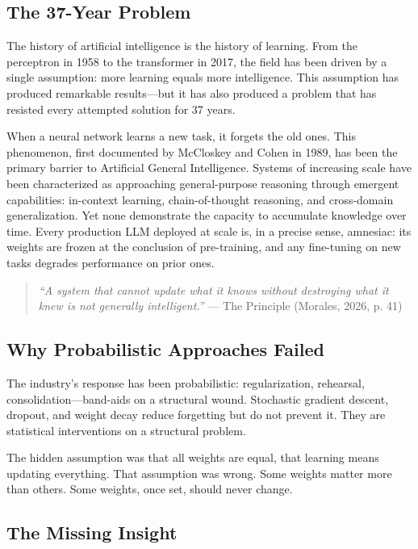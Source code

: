 \documentclass{article}
\begin{document}
\subsection{The 37-Year Problem}

The history of artificial intelligence is the history of learning. From the perceptron in 1958 to the transformer in 2017, the field has been driven by a single assumption: more learning equals more intelligence. This assumption has produced remarkable results---but it has also produced a problem that has resisted every attempted solution for 37 years.

When a neural network learns a new task, it forgets the old ones. This phenomenon, first documented by McCloskey and Cohen in 1989, has been the primary barrier to Artificial General Intelligence. Systems of increasing scale have been characterized as approaching general-purpose reasoning through emergent capabilities: in-context learning, chain-of-thought reasoning, and cross-domain generalization. Yet none demonstrate the capacity to accumulate knowledge over time. Every production LLM deployed at scale is, in a precise sense, amnesiac: its weights are frozen at the conclusion of pre-training, and any fine-tuning on new tasks degrades performance on prior ones.

\begin{quote}
\textit{``A system that cannot update what it knows without destroying what it knew is not generally intelligent.''} --- The Principle (Morales, 2026, p. 41)
\end{quote}

\subsection{Why Probabilistic Approaches Failed}

The industry's response has been probabilistic: regularization, rehearsal, consolidation---band-aids on a structural wound. Stochastic gradient descent, dropout, and weight decay reduce forgetting but do not prevent it. They are statistical interventions on a structural problem.

The hidden assumption was that all weights are equal, that learning means updating everything. That assumption was wrong. Some weights matter more than others. Some weights, once set, should never change.

\subsection{The Missing Insight}
\end{document}
